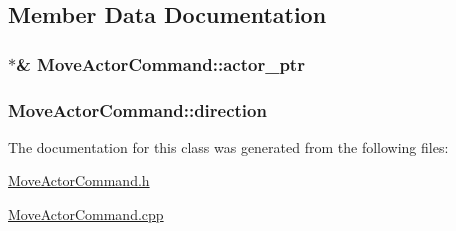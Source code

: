 \subsection{Member Data Documentation}
\hypertarget{class_move_actor_command_a1385801ea83705b51333acef7315c7bc}{}
\subsubsection[{actor\+\_\+ptr}]{$\ast$\& Move\+Actor\+Command\+::actor\+\_\+ptr\hspace{0.3cm}{\ttfamily [private]}}\label{class_move_actor_command_a1385801ea83705b51333acef7315c7bc}
\hypertarget{class_move_actor_command_a861dbc2f40f80e60242b997bb015917d}{}
\subsubsection[{direction}]{ Move\+Actor\+Command\+::direction\hspace{0.3cm}{\ttfamily [private]}}\label{class_move_actor_command_a861dbc2f40f80e60242b997bb015917d}


The documentation for this class was generated from the following files\+:\begin{DoxyCompactItemize}
\item 
\hyperlink{_move_actor_command_8h}{Move\+Actor\+Command.\+h}\item 
\hyperlink{_move_actor_command_8cpp}{Move\+Actor\+Command.\+cpp}\end{DoxyCompactItemize}
